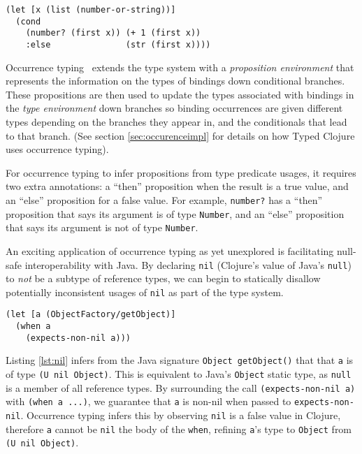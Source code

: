 \begin{lstlisting}[caption=A well typed form utilising occurrence typing with Clojure syntax, label=lst:occ1]
(let [x (list (number-or-string))]
  (cond 
    (number? (first x)) (+ 1 (first x))
    :else               (str (first x))))
\end{lstlisting}

Occurrence typing~\cite{TF08,TF10} extends the type 
system with a \emph{proposition environment} that represents 
the information on the types of bindings down conditional branches.
These propositions are then used to update the types associated
with bindings in the \emph{type environment} down branches
so binding occurrences are given different types 
depending on the branches they appear in, and the conditionals
that lead to that branch.
(See section \ref{sec:occurenceimpl} for details on how Typed Clojure uses occurrence typing).

For occurrence typing to infer propositions from type predicate usages, it requires 
two extra annotations: a ``then'' proposition
when the result is a true value, and an ``else'' proposition for a false value.
For example, \lstinline|number?| has a ``then'' proposition that says its argument
is of type \lstinline|Number|, and an ``else'' proposition that says its argument is not of type \lstinline|Number|.

An exciting application of occurrence typing as yet unexplored is facilitating null-safe interoperability with Java.
By declaring \lstinline|nil| (Clojure's value of Java's \lstinline|null|) to \emph{not} be a subtype of reference types,
we can begin to statically disallow potentially inconsistent usages of \lstinline|nil| as part of the type system.

\begin{lstlisting}[caption=Observing nil-checks using occurrence typing, label=lst:nil]
(let [a (ObjectFactory/getObject)]
  (when a
    (expects-non-nil a)))
\end{lstlisting}

Listing \ref{lst:nil} infers from the Java signature \lstinline|Object getObject()| that
that \lstinline|a| is of type \lstinline|(U nil Object)|. This is equivalent to Java's
\lstinline|Object| static type, as \lstinline|null| is a member of all reference types. By surrounding
the call \lstinline|(expects-non-nil a)| with \lstinline|(when a ...)|, we guarantee that
\lstinline|a| is non-nil when passed to \lstinline|expects-non-nil|. Occurrence typing infers
this by observing \lstinline|nil| is a false value in Clojure, therefore \lstinline|a| cannot
be \lstinline|nil| the body of the \lstinline|when|, refining \lstinline|a|'s type to \lstinline|Object|
from \lstinline|(U nil Object)|.

